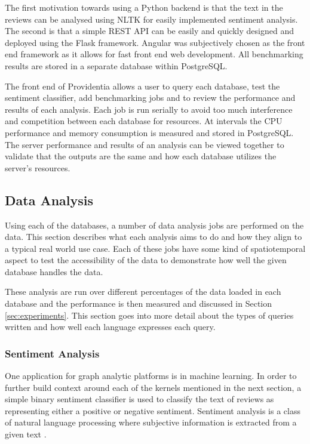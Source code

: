 The first motivation towards using a Python backend is that the text in the reviews can be analysed using NLTK for easily implemented sentiment analysis. The second is that a simple REST API can be easily and quickly designed and deployed using the Flask framework. Angular was subjectively chosen as the front end framework as it allows for fast front end web development. All benchmarking results are stored in a separate database within PostgreSQL.

The front end of Providentia allows a user to query each database, test the sentiment classifier, add benchmarking jobs and to review the performance and results of each analysis. Each job is run serially to avoid too much interference and competition between each database for resources. At intervals the CPU performance and memory consumption is measured and stored in PostgreSQL. The server performance and results of an analysis can be viewed together to validate that the outputs are the same and how each database utilizes the server's resources.

\subsection{Data Analysis}
Using each of the databases, a number of data analysis jobs are performed on the data. This section describes what each analysis aims to do and how they align to a typical real world use case. Each of these jobs have some kind of spatiotemporal aspect to test the accessibility of the data to demonstrate how well the given database handles the data.

These analysis are run over different percentages of the data loaded in each database and the performance is then measured and discussed in Section \ref{sec:experiments}. This section goes into more detail about the types of queries written and how well each language expresses each
query.

\subsubsection{Sentiment Analysis}
One application for graph analytic platforms is in machine learning. In order to further build context around each of the kernels mentioned in the next section, a simple binary sentiment classifier is used to classify the text of reviews as representing either a positive or negative sentiment. Sentiment analysis is a class of natural language processing where subjective information is extracted from a given text \cite{sentiment-analysis-gupta}.

